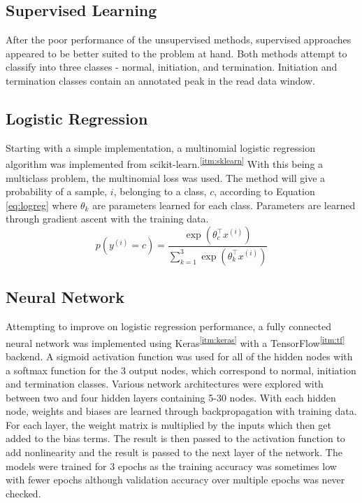 \documentclass{article}
\newcommand{\cited}[1]{\textsuperscript{\ref{itm:#1}}}
\begin{document}
\subsection{Supervised Learning}
After the poor performance of the unsupervised methods, supervised approaches appeared to be better suited to the problem at hand.  Both methods attempt to classify into three classes - normal, initiation, and termination.  Initiation and termination classes contain an annotated peak in the read data window.

\subsection*{Logistic Regression}
Starting with a simple implementation, a multinomial logistic regression algorithm was implemented from scikit-learn.\cited{sklearn}  With this being a multiclass problem, the multinomial loss was used.  The method will give a probability of a sample, $i$, belonging to a class, $c$, according to Equation \ref{eq:logreg} where $\theta_k$ are parameters learned for each class.  Parameters are learned through gradient ascent with the training data.
\begin{equation}
    \label{eq:logreg}
    p(y^{(i)} = c) = \frac{\exp(\theta_c^\top x^{(i)})}{\sum\limits_{k=1}^3 \exp(\theta_k^\top x^{(i)})}
\end{equation}

\subsection*{Neural Network}
Attempting to improve on logistic regression performance, a fully connected neural network was implemented using Keras\cited{keras} with a TensorFlow\cited{tf} backend.  A sigmoid activation function was used for all of the hidden nodes with a softmax function for the 3 output nodes, which correspond to normal, initiation and termination classes. Various network architectures were explored with between two and four hidden layers containing 5-30 nodes.  With each hidden node, weights and biases are learned through backpropagation with training data.  For each layer, the weight matrix is multiplied by the inputs which then get added to the bias terms. The result is then passed to the activation function to add nonlinearity and the result is passed to the next layer of the network.  The models were trained for 3 epochs as the training accuracy was sometimes low with fewer epochs although validation accuracy over multiple epochs was never checked.
\end{document}
